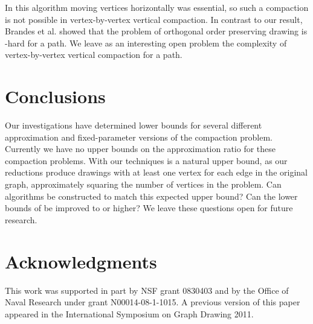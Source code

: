 \documentclass[12pt]{article}
\theoremstyle{definitions}
\begin{document}
In this algorithm moving vertices horizontally was essential, so such a compaction is not possible in vertex-by-vertex vertical compaction. In contrast to our result, Brandes et al. showed that the problem of orthogonal order preserving drawing is -hard for a path\cite{Brandes-Ortho}. We leave as an interesting open problem the complexity of vertex-by-vertex vertical compaction for a path.

\section{Conclusions}
Our investigations have determined lower bounds for several different approximation and fixed-parameter versions of the compaction problem. Currently we have no upper bounds on the approximation ratio for these compaction problems. With our techniques  is a natural upper bound, as our reductions produce drawings with at least one vertex for each edge in the original graph, approximately squaring the number of vertices in the problem. Can algorithms be constructed to match this expected upper bound? Can the lower bounds of  be improved to  or higher? We leave these questions open for future research.

\ifFull
\section*{Acknowledgments}
This work was supported in part by NSF grant 0830403 and by the Office of Naval Research under grant N00014-08-1-1015. A previous version of this paper appeared in the International Symposium on Graph Drawing 2011.
\fi

\raggedright


\end{document}
